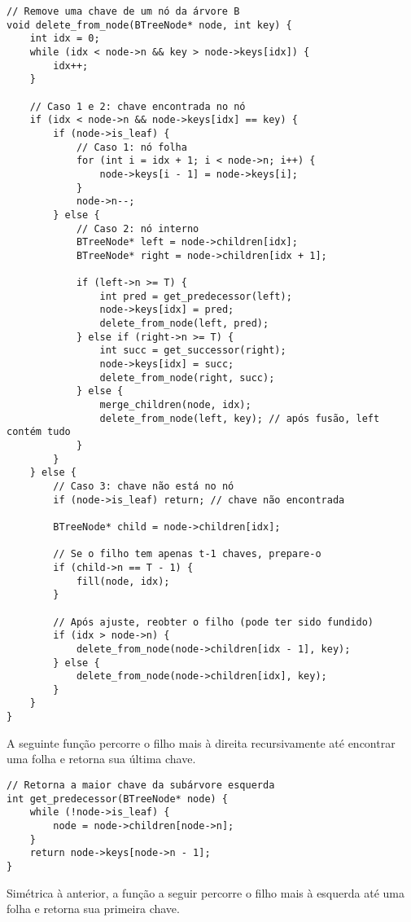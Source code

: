 \begin{lstlisting}
// Remove uma chave de um nó da árvore B
void delete_from_node(BTreeNode* node, int key) {
    int idx = 0;
    while (idx < node->n && key > node->keys[idx]) {
        idx++;
    }

    // Caso 1 e 2: chave encontrada no nó
    if (idx < node->n && node->keys[idx] == key) {
        if (node->is_leaf) {
            // Caso 1: nó folha
            for (int i = idx + 1; i < node->n; i++) {
                node->keys[i - 1] = node->keys[i];
            }
            node->n--;
        } else {
            // Caso 2: nó interno
            BTreeNode* left = node->children[idx];
            BTreeNode* right = node->children[idx + 1];

            if (left->n >= T) {
                int pred = get_predecessor(left);
                node->keys[idx] = pred;
                delete_from_node(left, pred);
            } else if (right->n >= T) {
                int succ = get_successor(right);
                node->keys[idx] = succ;
                delete_from_node(right, succ);
            } else {
                merge_children(node, idx);
                delete_from_node(left, key); // após fusão, left contém tudo
            }
        }
    } else {
        // Caso 3: chave não está no nó
        if (node->is_leaf) return; // chave não encontrada

        BTreeNode* child = node->children[idx];

        // Se o filho tem apenas t-1 chaves, prepare-o
        if (child->n == T - 1) {
            fill(node, idx);
        }

        // Após ajuste, reobter o filho (pode ter sido fundido)
        if (idx > node->n) {
            delete_from_node(node->children[idx - 1], key);
        } else {
            delete_from_node(node->children[idx], key);
        }
    }
}
\end{lstlisting}

A seguinte função percorre o filho mais à direita recursivamente até encontrar uma folha e retorna sua última chave.

\begin{lstlisting}
// Retorna a maior chave da subárvore esquerda
int get_predecessor(BTreeNode* node) {
    while (!node->is_leaf) {
        node = node->children[node->n];
    }
    return node->keys[node->n - 1];
}
\end{lstlisting}

Simétrica à anterior, a função a seguir percorre o filho mais à esquerda até uma folha e retorna sua primeira chave.

